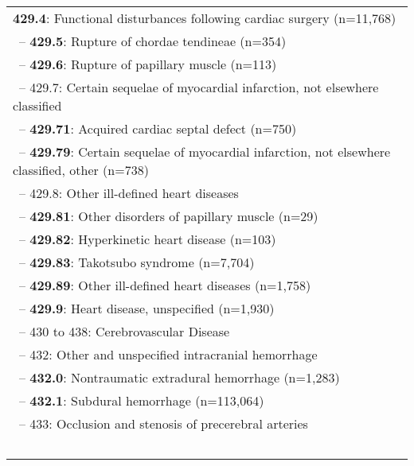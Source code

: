 \begin{longtable}{p{\textwidth}}
{\color{ForestGreen} \textbf{429.4}}: Functional disturbances following cardiac surgery (n=11,768)} \\ \-\ \hspace{30pt}\footnotesize{-- {\color{ForestGreen} \textbf{429.5}}: Rupture of chordae tendineae (n=354)} \\ \-\ \hspace{30pt}\footnotesize{-- {\color{ForestGreen} \textbf{429.6}}: Rupture of papillary muscle (n=113)} \\ \-\ \hspace{30pt}\footnotesize{-- 429.7: Certain sequelae of myocardial infarction, not elsewhere classified} \\ \-\ \hspace{40pt}\footnotesize{-- {\color{ForestGreen} \textbf{429.71}}: Acquired cardiac septal defect (n=750)} \\ \-\ \hspace{40pt}\footnotesize{-- {\color{ForestGreen} \textbf{429.79}}: Certain sequelae of myocardial infarction, not elsewhere classified, other (n=738)} \\ \-\ \hspace{30pt}\footnotesize{-- 429.8: Other ill-defined heart diseases} \\ \-\ \hspace{40pt}\footnotesize{-- {\color{ForestGreen} \textbf{429.81}}: Other disorders of papillary muscle (n=29)} \\ \-\ \hspace{40pt}\footnotesize{-- {\color{ForestGreen} \textbf{429.82}}: Hyperkinetic heart disease (n=103)} \\ \-\ \hspace{40pt}\footnotesize{-- {\color{ForestGreen} \textbf{429.83}}: Takotsubo syndrome (n=7,704)} \\ \-\ \hspace{40pt}\footnotesize{-- {\color{ForestGreen} \textbf{429.89}}: Other ill-defined heart diseases (n=1,758)} \\ \-\ \hspace{30pt}\footnotesize{-- {\color{ForestGreen} \textbf{429.9}}: Heart disease, unspecified (n=1,930)} \\ \-\ \hspace{10pt}\footnotesize{-- 430 to 438: Cerebrovascular Disease} \\ \-\ \hspace{20pt}\footnotesize{-- 432: Other and unspecified intracranial hemorrhage} \\ \-\ \hspace{30pt}\footnotesize{-- {\color{ForestGreen} \textbf{432.0}}: Nontraumatic extradural hemorrhage (n=1,283)} \\ \-\ \hspace{30pt}\footnotesize{-- {\color{ForestGreen} \textbf{432.1}}: Subdural hemorrhage (n=113,064)} \\ \-\ \hspace{20pt}\footnotesize{-- 433: Occlusion and stenosis of precerebral arteries} \\ \-\ 
\end{longtable}
